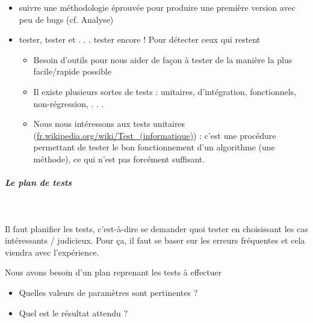 \documentclass[11pt,a4paper]{article}
\begin{document}
					\begin{itemize}
				
			\item 
              suivre une m\'ethodologie \'eprouv\'ee pour produire une premi\`ere version avec peu de bugs
              (cf. Analyse)
            
			\item 
              tester, tester et . . . tester encore ! Pour d\'etecter ceux qui restent
              
					\begin{itemize}
				
			\item Besoin d'outils pour nous aider de fa\c con \`a tester de la mani\`ere la plus facile/rapide possible
			\item Il existe plusieurs sortes de tests : unitaires, d'int\'egration, fonctionnels, non-r\'egression, . . .
			\item Nous nous int\'eressons aux tests unitaires (\url{fr.wikipedia.org/wiki/Test\_(informatique)}) : 
                c'est une proc\'edure permettant de tester le bon fonctionnement d'un algorithme (une m\'ethode), ce qui n'est pas forc\'ement suffisant.
					\end{itemize}
				
					\end{itemize}
				
            \par
        
			
		\subparagraph{Le plan de tests} 
		
					\textcolor{white}{.} \par
				
          Il faut planifier les tests, c'est-\`a-dire se demander quoi tester en choisissant les cas int\'eressants / judicieux.
          Pour \c ca, il faut se baser sur les erreurs fr\'equentes et cela viendra avec l'exp\'erience.
        
            \par
        
          Nous avons besoin d'un plan reprenant les tests \`a effectuer
          
					\begin{itemize}
				
			\item Quelles valeurs de param\`etres sont pertinentes ?
			\item Quel est le r\'esultat attendu ?
					\end{itemize}
				
\end{document}
